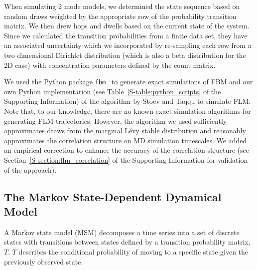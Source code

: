 \documentclass[journal=jctcce,manuscript=article]{achemso}
\begin{document}
  When simulating 2 mode models, we determined the state sequence based on
  random draws weighted by the appropriate row of the probability transition
  matrix. We then drew hops and dwells based on the current state of the
  system. Since we calculated the transition probabilities from a finite data
  set, they have an associated uncertainty which we incorporated by re-sampling
  each row from a two dimensional Dirichlet distribution (which is also a beta
  distribution for the 2D case) with concentration parameters defined by the
  count matrix.~\cite{bacallado_bayesian_2009}
  
  We used the Python package \texttt{fbm}~\cite{flynn_exact_2019} to generate exact simulations of FBM
  and our own Python implementation (see Table~\ref{S-table:python_scripts} of
  the Supporting Information) of the algorithm by Stoev and Taqqu to
  simulate FLM.~\cite{stoev_simulation_2004} Note that, to our knowledge, there
  are no known exact simulation algorithms for generating FLM trajectories.
  However, the algorithm we used sufficiently approximates draws from the
  marginal L\'evy stable distribution and reasonably approximates the
  correlation structure on MD simulation timescales. We added an empirical
  correction to enhance the accuracy of the correlation structure (see
  Section~\ref{S-section:flm_correlation} of the Supporting Information for
  validation of the approach).

  \subsection{The Markov State-Dependent Dynamical Model}\label{method:MSMs}  

  A Markov state model (MSM) decomposes a time series into a set of discrete
  states with transitions between states defined by a transition probability
  matrix, $T$.  $T$ describes the conditional probability of moving to a
  specific state given the previously observed
  state.~\cite{pande_everything_2010,wehmeyer_introduction_2018}
\end{document}
